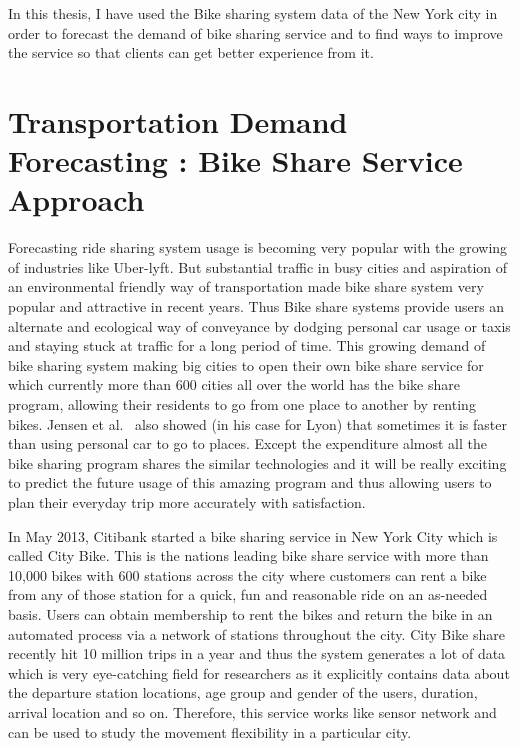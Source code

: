 In this thesis, I have used the Bike sharing system data of the New York city in order to forecast the demand of bike sharing service and to find ways to improve the service so that clients can get better experience from it. 

\section {Transportation Demand Forecasting : Bike Share Service Approach}

Forecasting ride sharing system usage is becoming very popular with the growing of industries like Uber-lyft. But substantial traffic in busy cities and aspiration of an environmental friendly way of transportation made bike share system very popular and attractive in recent years. Thus Bike share systems provide users an alternate and ecological way of conveyance by dodging personal car usage or taxis and staying stuck at traffic for a long period of time. This growing demand of bike sharing system making big cities to open their own bike share service for which currently more than 600 cities all over the world has the bike share program, allowing their residents to go from one place to another by renting bikes. Jensen et al.~\cite{jensen2010characterizing} also showed (in his case for Lyon) that sometimes it is faster than using personal car to go to places. Except the expenditure almost all the bike sharing program shares the similar technologies and it will be really exciting to predict the future usage of this amazing program and thus allowing users to plan their everyday trip more accurately with satisfaction. 

In May 2013, Citibank started a bike sharing service in New York City which is called City Bike. This is the nations leading bike share service with more than 10,000 bikes with 600 stations across the city where customers can rent a bike from any of those station for a quick, fun and reasonable ride on an as-needed basis. Users can obtain membership to rent the bikes and return the bike in an automated process via a network of stations throughout the city. City Bike share recently hit 10 million trips in a year and thus the system generates a lot of data which is very eye-catching field for researchers as it explicitly contains data about the departure station locations, age group and gender of the users, duration, arrival location and so on. Therefore, this service works like sensor network and can be used to study the movement flexibility in a particular city.  


